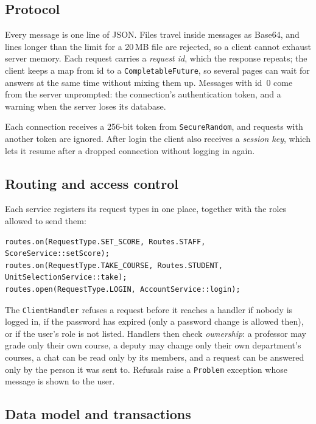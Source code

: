 \documentclass[11pt,a4paper]{article}
\begin{document}
\subsection{Protocol}

Every message is one line of JSON. Files travel inside messages as Base64, and lines longer than the limit for a 20\,MB file are rejected, so a client cannot exhaust server memory. Each request carries a \emph{request id}, which the response repeats; the client keeps a map from id to a \texttt{CompletableFuture}, so several pages can wait for answers at the same time without mixing them up. Messages with id~0 come from the server unprompted: the connection's authentication token, and a warning when the server loses its database.

Each connection receives a 256-bit token from \texttt{SecureRandom}, and requests with another token are ignored. After login the client also receives a \emph{session key}, which lets it resume after a dropped connection without logging in again.

\subsection{Routing and access control}

Each service registers its request types in one place, together with the roles allowed to send them:

\begin{lstlisting}
routes.on(RequestType.SET_SCORE, Routes.STAFF, ScoreService::setScore);
routes.on(RequestType.TAKE_COURSE, Routes.STUDENT, UnitSelectionService::take);
routes.open(RequestType.LOGIN, AccountService::login);
\end{lstlisting}

The \texttt{ClientHandler} refuses a request before it reaches a handler if nobody is logged in, if the password has expired (only a password change is allowed then), or if the user's role is not listed. Handlers then check \emph{ownership}: a professor may grade only their own course, a deputy may change only their own department's courses, a chat can be read only by its members, and a request can be answered only by the person it was sent to. Refusals raise a \texttt{Problem} exception whose message is shown to the user.

\subsection{Data model and transactions}
\end{document}
